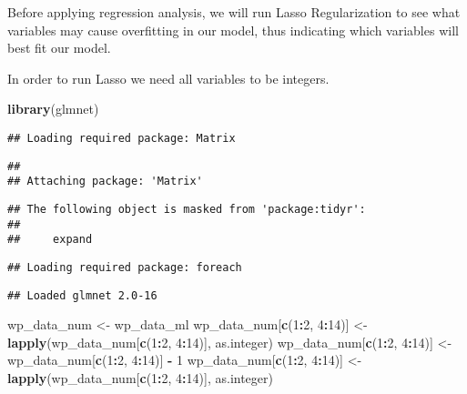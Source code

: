\documentclass[]{article}
\newenvironment{Shaded}{\begin{snugshade}}{\end{snugshade}}
\newcommand{\KeywordTok}[1]{\textcolor[rgb]{0.13,0.29,0.53}{\textbf{#1}}}
\newcommand{\DecValTok}[1]{\textcolor[rgb]{0.00,0.00,0.81}{#1}}
\newcommand{\StringTok}[1]{\textcolor[rgb]{0.31,0.60,0.02}{#1}}
\newcommand{\OperatorTok}[1]{\textcolor[rgb]{0.81,0.36,0.00}{\textbf{#1}}}
\newcommand{\NormalTok}[1]{#1}
\begin{document}
Before applying regression analysis, we will run Lasso Regularization to
see what variables may cause overfitting in our model, thus indicating
which variables will best fit our model.

In order to run Lasso we need all variables to be integers.

\begin{Shaded}
\begin{Highlighting}[]
\KeywordTok{library}\NormalTok{(glmnet)}
\end{Highlighting}
\end{Shaded}

\begin{verbatim}
## Loading required package: Matrix
\end{verbatim}

\begin{verbatim}
## 
## Attaching package: 'Matrix'
\end{verbatim}

\begin{verbatim}
## The following object is masked from 'package:tidyr':
## 
##     expand
\end{verbatim}

\begin{verbatim}
## Loading required package: foreach
\end{verbatim}

\begin{verbatim}
## Loaded glmnet 2.0-16
\end{verbatim}

\begin{Shaded}
\begin{Highlighting}[]
\NormalTok{wp_data_num <-}\StringTok{ }\NormalTok{wp_data_ml}
\NormalTok{wp_data_num[}\KeywordTok{c}\NormalTok{(}\DecValTok{1}\OperatorTok{:}\DecValTok{2}\NormalTok{, }\DecValTok{4}\OperatorTok{:}\DecValTok{14}\NormalTok{)] <-}\StringTok{ }\KeywordTok{lapply}\NormalTok{(wp_data_num[}\KeywordTok{c}\NormalTok{(}\DecValTok{1}\OperatorTok{:}\DecValTok{2}\NormalTok{, }\DecValTok{4}\OperatorTok{:}\DecValTok{14}\NormalTok{)], as.integer)}
\NormalTok{wp_data_num[}\KeywordTok{c}\NormalTok{(}\DecValTok{1}\OperatorTok{:}\DecValTok{2}\NormalTok{, }\DecValTok{4}\OperatorTok{:}\DecValTok{14}\NormalTok{)] <-}\StringTok{ }\NormalTok{wp_data_num[}\KeywordTok{c}\NormalTok{(}\DecValTok{1}\OperatorTok{:}\DecValTok{2}\NormalTok{, }\DecValTok{4}\OperatorTok{:}\DecValTok{14}\NormalTok{)] }\OperatorTok{-}\StringTok{ }\DecValTok{1}
\NormalTok{wp_data_num[}\KeywordTok{c}\NormalTok{(}\DecValTok{1}\OperatorTok{:}\DecValTok{2}\NormalTok{, }\DecValTok{4}\OperatorTok{:}\DecValTok{14}\NormalTok{)] <-}\StringTok{ }\KeywordTok{lapply}\NormalTok{(wp_data_num[}\KeywordTok{c}\NormalTok{(}\DecValTok{1}\OperatorTok{:}\DecValTok{2}\NormalTok{, }\DecValTok{4}\OperatorTok{:}\DecValTok{14}\NormalTok{)], as.integer)}
\end{Highlighting}
\end{Shaded}
\end{document}
